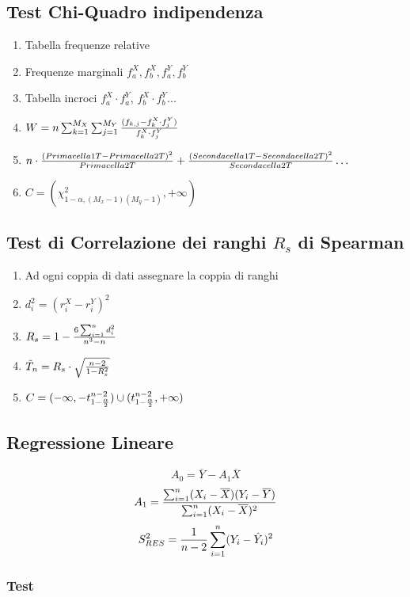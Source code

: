 \documentclass[12pt]{article}
\begin{document}
    \subsection{Test Chi-Quadro indipendenza}
    \begin{enumerate}
        \item Tabella frequenze relative
        \item Frequenze marginali $f^X_a, f^X_b, f^Y_a, f^Y_b$
        \item Tabella incroci $f^X_a \cdot f^Y_a$, $f^X_b \cdot f^Y_b$...
        \item $W = n \sum_{k=1}^{M_X} \sum_{j=1}^{M_Y} {{(f_{k,j} - f_k^X \cdot f_j^Y)} \over f_k^X \cdot f_j^Y}$
        \item $n \cdot {(Prima cella 1T - Prima cella 2T)^2 \over Prima cella 2T} + {(Seconda cella 1T - Seconda cella 2T)^2 \over Seconda cella 2T} \dots$
        \item $C = (\chi^2_{1-\alpha, (M_x - 1)(M_y - 1)}, +\infty)$
    \end{enumerate}
    \subsection{Test di Correlazione dei ranghi $R_s$ di Spearman}
    \begin{enumerate}
        \item Ad ogni coppia di dati assegnare la coppia di ranghi
        \item $d_i^2 = (r_i^X - r_i^Y)^2$
        \item $R_s = 1 - {{6\sum_{i = 1}^n d_i^2}\over{n^3 - n}}$
        \item $\tilde{T}_n = R_s \cdot \sqrt{{n-2}\over{1- R_s^2}}$
        \item $C = (-\infty, -t_{1-{\alpha \over 2}}^{n-2}) \cup (t_{1-{\alpha \over 2}}^{n-2}, +\infty)$
    \end{enumerate}

    \newpage
    \subsection{Regressione Lineare}
    $$A_0 = \overline{Y} - A_1\overline{X}$$
    $$A_1 = {{\sum_{i=1}^n(X_i - \overline{X})(Y_i - \overline{Y})} \over {\sum_{i=1}^n(X_i - \overline{X})^2}}$$
    $$S^2_{RES} = {1\over{n-2}} \sum_{i=1}^n(Y_i - \hat{Y}_i)^2$$
    \subsubsection{Test}
\end{document}
